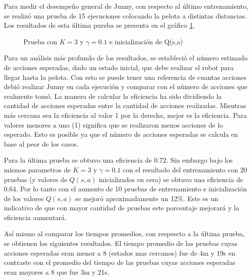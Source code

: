 Para medir el desempeño general de Junny, con respecto al último entrenamiento, se realizó una prueba de 15 ejecuciones colocando la pelota a distintas distancias. Los resultados de esta \'ultima pureba se presenta en el gr\'afico \ref{fig:mejor}. 

\begin{figure}[h]
\caption{Prueba con $K = 3$ y $ \gamma = 0.1 $ e inicializaci\'on de Q(s,a)}
\label{fig:mejor}
\end{figure} 

Para un análisis más profundo de los resultados, se estableci\'o el n\'umero estimado de acciones esperadas, dado un estado inicial, que debe realizar el robot para llegar hasta la pelota. Con esto se puede tener una referencia de cuantas acciones debió realizar Junny en cada ejecución y comparar con el número de acciones que realmente tomó. La manera de calcular la eficiencia ha sido dividiendo la cantidad de acciones esperadas entre la cantidad de acciones realizadas. Mientras más cercana sea la eficiencia al valor 1 por la derecha, mejor es la eficiencia. Para valores menores a uno (1) significa que se realizaron menos acciones de lo esperado. Esto es posible ya que el número de acciones esperadas se calcula en base al peor de los casos.  

Para la última prueba se obtuvo una eficiencia de $0.72$. Sin embargo bajo los mismos parametros de $K = 3$ y $ \gamma = 0.1 $ con el resultado del entrenamiento con 20 pruebas (y valores de $Q(s,a)$ inicializados en cero) se obtuvo una eficiencia de $0.64$. Por lo tanto con el aumento de 10 pruebas de entrenamiento e inicialización de los valores $Q(s,a)$ se mejoró aproximadamente un 12\%. Este es un indicativo de que con mayor cantidad de pruebas este porcentaje mejorar\'a y la eficiencia aumentará.

Así mismo al comparar los tiempos promedios, con respescto a la última prueba, se obtienen los siguientes resultados. El tiempo promedio de las pruebas cuyas acciones esperadas eran menor a 8 (estados mas cercanos) fue de 4m y 19s en contraste con el promedio del tiempo de las pruebas cuyas acciones esperadas eran mayores a 8 que fue 3m y 21s.

 

   

